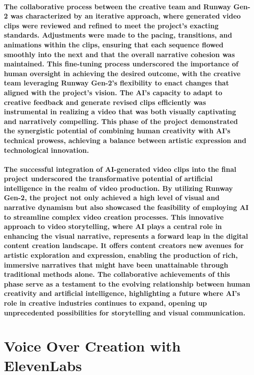 \documentclass[11pt,a4paper,oneside]{report}
\begin{document}
\paragraph{The collaborative process between the creative team and Runway Gen-2 was characterized by an iterative approach, where generated video clips were reviewed and refined to meet the project's exacting standards. Adjustments were made to the pacing, transitions, and animations within the clips, ensuring that each sequence flowed smoothly into the next and that the overall narrative cohesion was maintained. This fine-tuning process underscored the importance of human oversight in achieving the desired outcome, with the creative team leveraging Runway Gen-2's flexibility to enact changes that aligned with the project's vision. The AI's capacity to adapt to creative feedback and generate revised clips efficiently was instrumental in realizing a video that was both visually captivating and narratively compelling. This phase of the project demonstrated the synergistic potential of combining human creativity with AI's technical prowess, achieving a balance between artistic expression and technological innovation.}

\paragraph{The successful integration of AI-generated video clips into the final project underscored the transformative potential of artificial intelligence in the realm of video production. By utilizing Runway Gen-2, the project not only achieved a high level of visual and narrative dynamism but also showcased the feasibility of employing AI to streamline complex video creation processes. This innovative approach to video storytelling, where AI plays a central role in enhancing the visual narrative, represents a forward leap in the digital content creation landscape. It offers content creators new avenues for artistic exploration and expression, enabling the production of rich, immersive narratives that might have been unattainable through traditional methods alone. The collaborative achievements of this phase serve as a testament to the evolving relationship between human creativity and artificial intelligence, highlighting a future where AI's role in creative industries continues to expand, opening up unprecedented possibilities for storytelling and visual communication.}

\section{Voice Over Creation with ElevenLabs}
\end{document}
